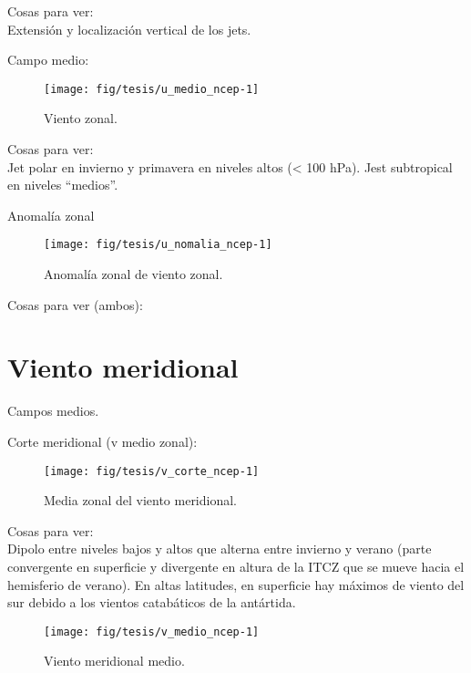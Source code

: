 \documentclass[spanish,a4paper]{book}
\begin{document}
Cosas para ver:\\
Extensión y localización vertical de los jets.

Campo medio:

\begin{figure}

{\centering \texttt{[image: fig/tesis/u\_medio\_ncep-1]} 

}

\caption{Viento zonal.}\label{fig:u_medio_ncep}
\end{figure}

Cosas para ver:\\
Jet polar en invierno y primavera en niveles altos (\textless{} 100
hPa). Jest subtropical en niveles ``medios''.

Anomalía zonal

\begin{figure}

{\centering \texttt{[image: fig/tesis/u\_nomalia\_ncep-1]} 

}

\caption{Anomalía zonal de viento zonal.}\label{fig:u_nomalia_ncep}
\end{figure}

Cosas para ver (ambos):

\section{Viento meridional}\label{viento-meridional}

Campos medios.

Corte meridional (v medio zonal):

\begin{figure}

{\centering \texttt{[image: fig/tesis/v\_corte\_ncep-1]} 

}

\caption{Media zonal del viento meridional.}\label{fig:v_corte_ncep}
\end{figure}

Cosas para ver:\\
Dipolo entre niveles bajos y altos que alterna entre invierno y verano
(parte convergente en superficie y divergente en altura de la ITCZ que
se mueve hacia el hemisferio de verano). En altas latitudes, en
superficie hay máximos de viento del sur debido a los vientos
catabáticos de la antártida.

\begin{figure}

{\centering \texttt{[image: fig/tesis/v\_medio\_ncep-1]} 

}

\caption{Viento meridional medio.}\label{fig:v_medio_ncep}
\end{figure}
\end{document}
